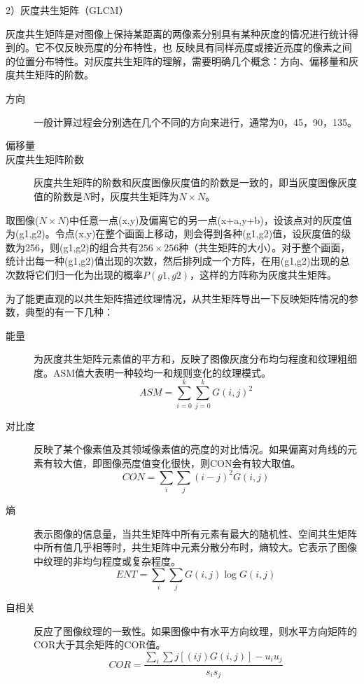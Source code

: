 \documentclass[12pt]{article}
\begin{document}
2）灰度共生矩阵（GLCM）

灰度共生矩阵是对图像上保持某距离的两像素分别具有某种灰度的情况进行统计得到的。它不仅反映亮度的分布特性，也
反映具有同样亮度或接近亮度的像素之间的位置分布特性。对灰度共生矩阵的理解，需要明确几个概念：方向、偏移量和灰度共生矩阵的阶数。
\begin{description}
    \item[方向] 一般计算过程会分别选在几个不同的方向来进行，通常为0，45，90，135。
    \item[偏移量] 
    \item[灰度共生矩阵阶数] 灰度共生矩阵的阶数和灰度图像灰度值的阶数是一致的，即当灰度图像灰度值的阶数是$N$时，灰度共生矩阵为$N \times N$。
\end{description}

 取图像($N \times N$)中任意一点(x,y)及偏离它的另一点(x+a,y+b)，设该点对的灰度值为(g1,g2)。令点(x,y)在整个画面上移动，则会得到各种(g1,g2)值，设灰度值的级数为256，则(g1,g2)的组合共有$256\times256$种（共生矩阵的大小）。对于整个画面，统计出每一种(g1,g2)值出现的次数，然后排列成一个方阵，在用(g1,g2)出现的总次数将它们归一化为出现的概率$P(g1,g2)$，这样的方阵称为灰度共生矩阵。
 
 为了能更直观的以共生矩阵描述纹理情况，从共生矩阵导出一下反映矩阵情况的参数，典型的有一下几种：
 \begin{description}
     \item[能量] 为灰度共生矩阵元素值的平方和，反映了图像灰度分布均匀程度和纹理粗细度。ASM值大表明一种较均一和规则变化的纹理模式。
         \begin{displaymath}
             ASM=\sum_{i=0}^{k}\sum_{j=0}^{k}G(i,j)^{2}
         \end{displaymath}
     \item[对比度] 反映了某个像素值及其领域像素值的亮度的对比情况。如果偏离对角线的元素有较大值，即图像亮度值变化很快，则CON会有较大取值。
         \begin{displaymath}
             CON=\sum_{i}\sum_{j}(i-j)^{2}G(i,j)
         \end{displaymath}
     \item[熵] 表示图像的信息量，当共生矩阵中所有元素有最大的随机性、空间共生矩阵中所有值几乎相等时，共生矩阵中元素分散分布时，熵较大。它表示了图像中纹理的非均匀程度或复杂程度。 
         \begin{displaymath}
             ENT=\sum_{i}\sum_{j}G(i,j)\log G(i,j)
         \end{displaymath}
     \item[自相关] 反应了图像纹理的一致性。如果图像中有水平方向纹理，则水平方向矩阵的COR大于其余矩阵的COR值。
         \begin{displaymath}
             COR=\frac{\sum_{i}\sum{j}[(ij)G(i,j)]-u_{i}u_{j}}{s_{i}s_{j}}
         \end{displaymath}
 \end{description}
 
\end{document}
